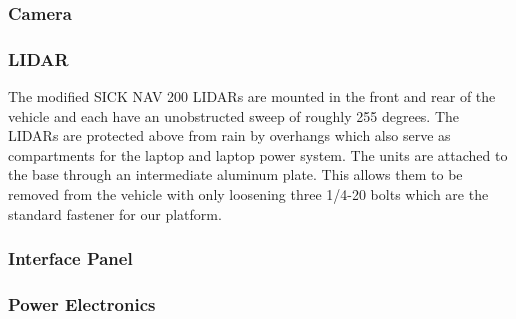 \subsubsection{Camera}

\subsubsection{LIDAR}
The modified SICK NAV 200 LIDARs are mounted in the front and rear of the vehicle and each have an unobstructed sweep of roughly 255 degrees. The LIDARs are protected above from rain by overhangs which also serve as compartments for the laptop and laptop power system. The units are attached to the base through an intermediate aluminum plate. This allows them to be removed from the vehicle with only loosening three 1/4-20 bolts which are the standard fastener for our platform.

\subsubsection{Interface Panel}

\subsubsection{Power Electronics}
